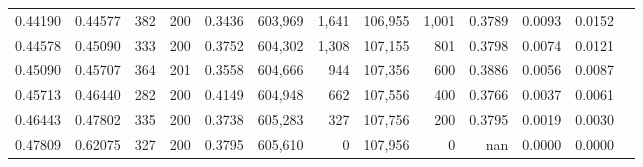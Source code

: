 \begin{tabular}{rrrrrrrrrrrrr}
0.44190 & 0.44577 &   382 & 200 &                                     0.3436 & 603,969 &   1,641 & 106,955 &   1,001 & 0.3789 & 0.0093 & 0.0152 \\
0.44578 & 0.45090 &   333 & 200 &                                     0.3752 & 604,302 &   1,308 & 107,155 &     801 & 0.3798 & 0.0074 & 0.0121 \\
0.45090 & 0.45707 &   364 & 201 &                                     0.3558 & 604,666 &     944 & 107,356 &     600 & 0.3886 & 0.0056 & 0.0087 \\
0.45713 & 0.46440 &   282 & 200 &                                     0.4149 & 604,948 &     662 & 107,556 &     400 & 0.3766 & 0.0037 & 0.0061 \\
0.46443 & 0.47802 &   335 & 200 &                                     0.3738 & 605,283 &     327 & 107,756 &     200 & 0.3795 & 0.0019 & 0.0030 \\
0.47809 & 0.62075 &   327 & 200 &                                     0.3795 & 605,610 &       0 & 107,956 &       0 &    nan & 0.0000 & 0.0000 \\
\bottomrule
\end{tabular}
